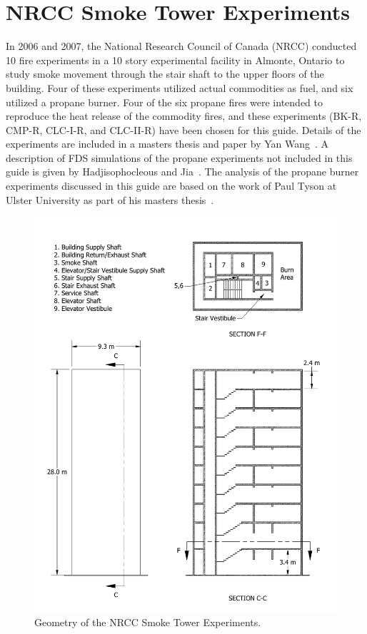 \section{NRCC Smoke Tower Experiments}

In 2006 and 2007, the National Research Council of Canada (NRCC) conducted 10 fire experiments in a 10 story experimental facility in Almonte, Ontario to study smoke movement through the stair shaft to the upper floors of the building. Four of these experiments utilized actual commodities as fuel, and six utilized a propane burner. Four of the six propane fires were intended to reproduce the heat release of the commodity fires, and these experiments (BK-R, CMP-R, CLC-I-R, and CLC-II-R) have been chosen for this guide. Details of the experiments are included in a masters thesis and paper by Yan Wang~\cite{Wang:Thesis,Wang:FT2011}. A description of FDS simulations of the propane experiments not included in this guide is given by Hadjisophocleous and Jia~\cite{Hadjisophocleous:FT2009}. The analysis of the propane burner experiments discussed in this guide are based on the work of Paul Tyson at Ulster University as part of his masters thesis~\cite{Tyson:Thesis}.

\begin{figure}[p]
\includegraphics[width=\textwidth]{FIGURES/NRCC_Smoke_Tower/NRCC_Smoke_Tower}
\caption[Geometry of the NRCC Smoke Tower Experiments]{Geometry of the NRCC Smoke Tower Experiments.}
\label{NRCC_Smoke_Tower_Drawing}
\end{figure}

